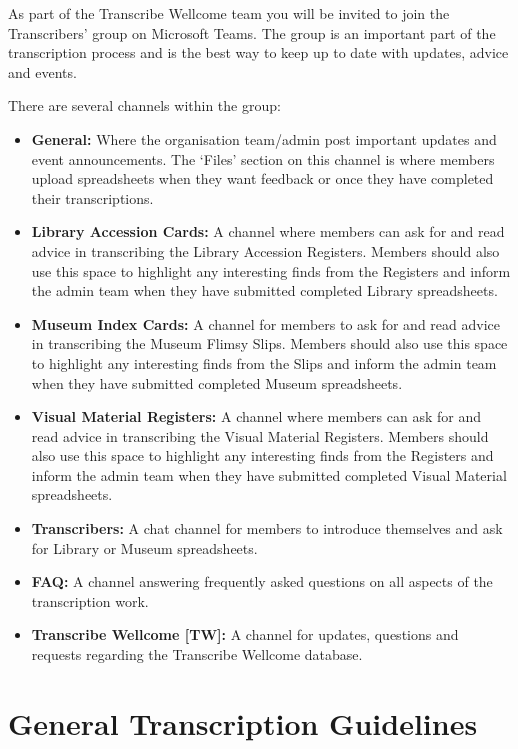 \documentclass[
  openany]{book}
\begin{document}
As part of the Transcribe Wellcome team you will be invited to join the Transcribers' group on Microsoft Teams. The group is an important part of the transcription process and is the best way to keep up to date with updates, advice and events.

There are several channels within the group:

\begin{itemize}
\item
  \textbf{General:} Where the organisation team/admin post important updates and event announcements. The `Files' section on this channel is where members upload spreadsheets when they want feedback or once they have completed their transcriptions.
\item
  \textbf{Library Accession Cards:} A channel where members can ask for and read advice in transcribing the Library Accession Registers. Members should also use this space to highlight any interesting finds from the Registers and inform the admin team when they have submitted completed Library spreadsheets.
\item
  \textbf{Museum Index Cards:} A channel for members to ask for and read advice in transcribing the Museum Flimsy Slips. Members should also use this space to highlight any interesting finds from the Slips and inform the admin team when they have submitted completed Museum spreadsheets.
\item
  \textbf{Visual Material Registers:} A channel where members can ask for and read advice in transcribing the Visual Material Registers. Members should also use this space to highlight any interesting finds from the Registers and inform the admin team when they have submitted completed Visual Material spreadsheets.
\item
  \textbf{Transcribers:} A chat channel for members to introduce themselves and ask for Library or Museum spreadsheets.
\item
  \textbf{FAQ:} A channel answering frequently asked questions on all aspects of the transcription work.
\item
  \textbf{Transcribe Wellcome {[}TW{]}:} A channel for updates, questions and requests regarding the Transcribe Wellcome database.
\end{itemize}

\hypertarget{general-transcription-guidelines}{%
\chapter{General Transcription Guidelines}\label{general-transcription-guidelines}}
\end{document}
